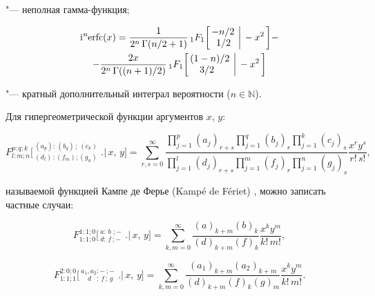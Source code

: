 "--- неполная гамма-функция;

\begin{multline}

\label{monako:ierfc}

\mathop{\rm i^{\textit{n}}erfc}(x)=\frac{1}{2^n\,\Gamma(n / 2+1)}\, _{1}F_{1}\bigg[\,^{\displaystyle -n / 2}_{\displaystyle \,\,\,1 / 2}\,\,\bigg.\bigg|\,-x^2\,\bigg] - \\-\frac{2x}{2^{n}\,\Gamma((n+1) / 2)}\, _{1}F_{1}\bigg[\,^{\displaystyle (1-n) / 2}_{\displaystyle \,\,\,\,\,\,3 / 2}\,\,\bigg.\bigg|\,-x^2\,\bigg]

\end{multline}

"--- кратный дополнительный интеграл вероятности ($ n\in\mathbb{N} $).



Для гипергеометрической функции аргументов $x$, $y$:

$$F_{l:m;n}^{p:q;k}\bigg[\,^{\displaystyle (a_p):\,(b_q)\,;\,(c_k)}_{\displaystyle (d_l)\,:(f_m);(g_n)}\,\,\bigg.\bigg|\,x,\,y\bigg]=\sum_{r,s=0}^\infty \frac{\prod\limits_{\scriptscriptstyle j=1}^{\scriptscriptstyle p} (a_j)_{r+s}  \prod\limits_{\scriptscriptstyle j=1}^{\scriptscriptstyle q} (b_j)_{r}  \prod\limits_{\scriptscriptstyle j=1}^{\scriptscriptstyle k} (c_j)_{s}}{\prod\limits_{\scriptscriptstyle j=1}^{\scriptscriptstyle l} (d_j)_{r+s}  \prod\limits_{\scriptscriptstyle j=1}^{\scriptscriptstyle m} (f_j)_{r}  \prod\limits_{\scriptscriptstyle j=1}^{\scriptscriptstyle n} (g_j)_{s}}\frac{x^r y^s}{r!\,s!},$$

называемой функцией Кампе де Ферье (Kamp\'e de F\'eriet) \cite{manako:kampe}, можно записать частные случаи:

\begin{equation}

\label{monako:kampe1}

F_{1:1;0}^{1:1;0}\bigg[\,^{\displaystyle a:\,b\,\,;-}_{\displaystyle d:\,f\,;-}\,\,\bigg.\bigg|\,x,\,y\bigg]=\sum_{k,m=0}^\infty\frac{(a)_{k+m}(b)_k}{(d)_{k+m}(f)_k}\frac{x^k y^m}{k!\,m!},

\end{equation}

\begin{equation}

\label{monako:kampe2}

F_{1:1;1}^{2:0;0}\bigg[\,^{\displaystyle a_1,a_2:-\,;-}_{\displaystyle \,\,\,\,\,\, d\,\,\,\,\,:\,f\,;\,g}\,\,\bigg.\bigg|\,x,\,y\bigg]=\sum_{k,m=0}^\infty\frac{(a_1)_{k+m}(a_2)_{k+m}}{(d)_{k+m}(f)_k (g)_m}\frac{x^k y^m}{k!\,m!}.

\end{equation}

